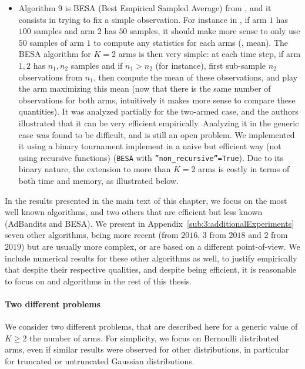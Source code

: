 \begin{itemize}
    \item Algorithm 9 is
    BESA (Best Empirical Sampled Average) from \cite{Baransi2014}, and it consists in trying to fix a simple observation.
    For instance in \UCB, if arm $1$ has $100$ samples and arm $2$ has $50$ samples, it should make more sense to only use $50$ samples of arm $1$ to compute any statistics for each arms (\eg, mean).
    The BESA algorithm for $K=2$ arms is then very simple: at each time step, if arm $1,2$ has $n_1,n_2$ samples and if $n_1>n_2$ (for instance), first sub-sample $n_2$ observations from $n_1$, then compute the mean of these observations, and play the arm maximizing this mean (now that there is the same number of observations for both arms, intuitively it makes more sense to compare these quantities).
    It was analyzed partially for the two-armed case, and the authors illustrated that it can be very efficient empirically.
    Analyzing it in the generic case was found to be difficult, and is still an open problem.
    We implemented it using a binary tournament implement in a naive but efficient way (not using recursive functions) (\texttt{BESA} with \texttt{''non\_recursive''=True}).
    Due to its binary nature, the extension to more than $K=2$ arms is costly in terms of both time and memory, as illustrated below.
\end{itemize}

In the results presented in the main text of this chapter, we focus on the most well known algorithms, and two others that are efficient but less known (AdBandits and BESA).
We present in Appendix~\ref{sub:3:additionalExperiments} seven other algorithms, being more recent (from $2016$, $3$ from $2018$ and $2$ from $2019$) but are usually more complex, or are based on a different point-of-view.
We include numerical results for these other algorithms as well, to justify empirically that despite their respective qualities, and despite being efficient, it is reasonable to focus on \UCB{} and \klUCB{} algorithms in the rest of this thesis.


\paragraph{Two different problems}

We consider two different problems, that are described here for a generic value of $K \geq 2$ the number of arms.
For simplicity, we focus on Bernoulli distributed arms, even if similar results were observed for other distributions, in particular for truncated or untruncated Gaussian distributions.

